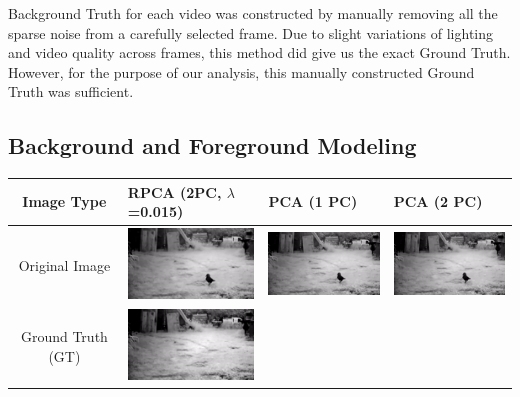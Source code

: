 \documentclass[11pt]{scrartcl} %
\theoremstyle{plain}
\begin{document}
Background Truth for each video was constructed by manually removing all the sparse noise from a carefully selected frame. Due to slight variations of lighting and video quality across frames, this method did give us the exact Ground Truth. However, for the purpose of our analysis, this manually constructed Ground Truth was sufficient.

\subsection{Background and Foreground Modeling}
\bigskip
\begin{minipage}{\linewidth}
\bgroup
  \begin{tabular}{ | c | m{2.8cm} | m{2.8cm} | m{2.8cm} | }
    \hline
    Image Type & RPCA \linebreak (2PC, $\lambda$=0.015) & PCA \linebreak (1 PC) & PCA \linebreak (2 PC)
    \\ \hline
	Original \linebreak Image
    &
    \begin{minipage}{.3\textwidth}
      \includegraphics[width=\linewidth, width=25mm]{figures_video/crow/original.png}
    \end{minipage}
    & 
    \begin{minipage}{.3\textwidth}
      \includegraphics[width=\linewidth, width=25mm]{figures_video/crow/original.png}
    \end{minipage}
    &
    \begin{minipage}{.3\textwidth}
      \includegraphics[width=\linewidth, width=25mm]{figures_video/crow/original.png}
    \end{minipage}
    \\ \hline
	Ground Truth (GT)
	&
    \begin{minipage}{.3\textwidth}
      \includegraphics[width=\linewidth, width=25mm]{figures_video/crow/background.png}

\end{minipage}
\end{tabular}
\end{minipage}
\end{document}
